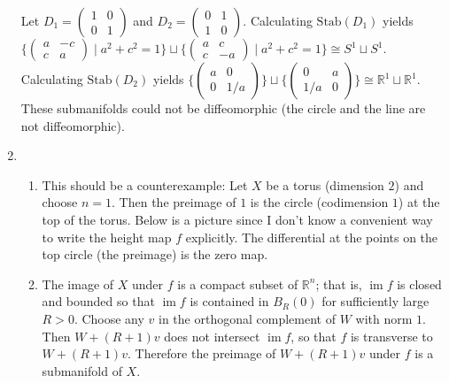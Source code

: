 \documentclass[11pt,leqno]{article}
\theoremstyle{plain}
\theoremstyle{definition}
\numberwithin{equation}{section}
\numberwithin{lem}{section}
\DeclareMathOperator{\im}{im}
\newcommand{\Stab}{\mathrm{Stab}}
\begin{document}
\begin{enumerate}
    Let $D_1 = (\!\begin{smallmatrix}
      1 & 0 \\ 0 & 1
    \end{smallmatrix}\!)$ and $D_2 = (\!\begin{smallmatrix}
      0 & 1 \\ 1 & 0
    \end{smallmatrix}\!)$. Calculating $\Stab(D_1)$ yields $\{(\!\begin{smallmatrix}
      a & -c \\ c & a
    \end{smallmatrix}\!)\mid a^2+c^2 = 1\}\sqcup\{(\!\begin{smallmatrix}
      a & c \\ c & -a
    \end{smallmatrix}\!)\mid a^2+c^2 = 1\}\cong S^1\sqcup S^1$. Calculating $\Stab(D_2)$ yields $\{(\!\begin{smallmatrix}
      a & 0 \\ 0 & 1/a
    \end{smallmatrix}\!)\}\sqcup\{(\!\begin{smallmatrix}
      0 & a \\ 1/a & 0
    \end{smallmatrix}\!)\}\cong \mathbb R^1\sqcup \mathbb R^1$. These submanifolds could not be diffeomorphic (the circle and the line are not diffeomorphic).
    \item\begin{enumerate}
      \item This should be a counterexample: Let $X$ be a torus (dimension $2$) and choose $n = 1$. Then the preimage of $1$ is the circle (codimension $1$) at the top of the torus. Below is a picture since I don't know a convenient way to write the height map $f$ explicitly. The differential at the points on the top circle (the preimage) is the zero map.\vspace*{5em}
      \item The image of $X$ under $f$ is a compact subset of $\mathbb R^n$; that is, $\im f$ is closed and bounded so that $\im f$ is contained in $B_R(0)$ for sufficiently large $R>0$. Choose any $v$ in the orthogonal complement of $W$ with norm $1$. Then $W + (R+1)v$ does not intersect $\im f$, so that $f$ is transverse to $W + (R+1)v$. Therefore the preimage of $W+ (R+1)v$ under $f$ is a submanifold of $X$.

\end{enumerate}
\end{enumerate}
\end{document}
